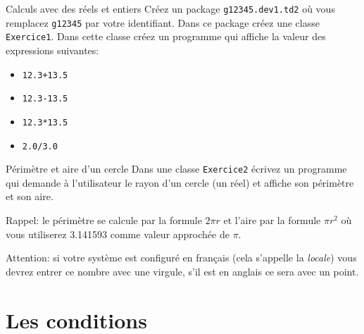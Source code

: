 \documentclass[a4paper,11pt]{article}
\begin{document}

\begin{Exercice}{Calculs avec des réels et entiers}
	Créez un package \texttt{g12345.dev1.td2} où vous remplacez \texttt{g12345} par votre identifiant.
	Dans ce package créez une classe \texttt{Exercice1}.
	Dans cette classe créez un programme qui affiche la valeur des expressions suivantes:
	
	\begin{itemize}		
		\item \texttt{12.3+13.5}
		\item \texttt{12.3-13.5}
		\item \texttt{12.3*13.5}
		\item \texttt{2.0/3.0}
	\end{itemize}
		
\end{Exercice}

\begin{Exercice}{Périmètre et aire d'un cercle}
	Dans une classe \texttt{Exercice2} écrivez un programme
	qui demande à l'utilisateur le rayon d'un cercle (un réel)
	et affiche son périmètre et son aire.
	
	Rappel: le périmètre se calcule par la formule $2\pi r$ et 
	l'aire par la formule $\pi r^2$ où vous utiliserez 3.141593 comme valeur approchée de $\pi$.
	
	Attention: si votre système est configuré en français (cela s'appelle la \emph{locale}) 
	vous devrez entrer ce nombre avec une virgule, s'il est en anglais ce sera avec un point.

\end{Exercice}



\section{Les conditions}
\end{document}

